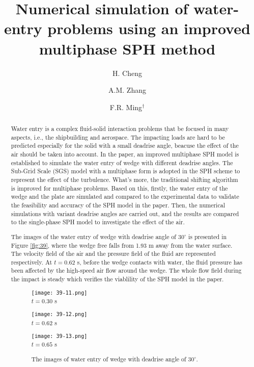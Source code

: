 \documentclass[10pt]{article}
\title{Numerical simulation of water-entry problems using an improved multiphase SPH method}
\date{}
\author[$\relax$]{H. Cheng}
\author[$\relax$]{A.M. Zhang}
\author[$\relax$]{F.R. Ming$^\dagger$}
\affil[$\relax$]{Harbin Engineering University, China}
\affil[$\relax$]{\email{\dagger}{mingfuren2006@126.com}}
\begin{document}
\maketitle


\begin{abstract}
Water entry is a complex fluid-solid interaction problems that be focused in many aspects, i.e., the shipbuilding and aerospace. The impacting loads are hard to be predicted especially for the solid with a small deadrise angle, beacuse the effect of the air should be taken into account. In the paper, an improved multiphase SPH model is established to simulate the water entry of wedge with different deadrise angles. The Sub-Grid Scale (SGS) model with a multiphase form is adopted in the SPH scheme to represent the effect of the turbulence. What's more, the traditional shifting algorithm is improved for multiphase problems. Based on this, firstly, the water entry of the wedge and the plate are simulated and compared to the experimental data to validate the feasibility and accuracy of the SPH model in the paper. Then, the numerical simulations with variant deadrise angles are carried out, and the results are compared to the single-phase SPH model to investigate the effect of the air. 

The images of the water entry of wedge with deadrise angle of $30^\circ$ is presented in Figure \ref{fig:39}, where the wedge free falls from 1.93 m away from the water surface. The velocity field of the air and the pressure field of the fluid are represented respectively. At $t=0.62$ s, before the wedge contacts with water, the fluid pressure has been affected by the high-speed air flow around the wedge. The whole flow field during the impact is steady which verifies the viablility of the SPH model in the paper.

\begin{figure}[!htb]
\begin{minipage}[t]{0.33\linewidth}
\centering
\texttt{[image: 39-11.png]}\\
$t=0.30$ s
\end{minipage}
\begin{minipage}[t]{0.33\linewidth}
\centering
\texttt{[image: 39-12.png]}\\
$t=0.62$ s
\end{minipage}
\begin{minipage}[t]{0.33\linewidth}
\centering
\texttt{[image: 39-13.png]}\\
$t=0.65$ s
\end{minipage}
\caption{The images of water entry of wedge with deadrise angle of $30^\circ$.}\label{fig:39}
\end{figure}

\end{abstract}



\addbib
\end{document}
